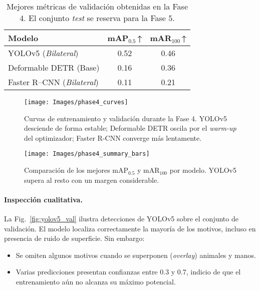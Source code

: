 \begin{table}[!ht]
  \centering
  \caption{Mejores métricas de validación obtenidas en la Fase 4.
           El conjunto \textit{test} se reserva para la Fase 5.}
  \label{tab:phase4_val}
  \begin{tabular}{lcc}
    \hline
    Modelo & mAP\(_{0.5}\)\,↑ & mAR\(_{100}\)\,↑\\
    \hline
    YOLOv5 (\textit{Bilateral})       & 0.52 & 0.46\\
    Deformable DETR (Base)            & 0.16 & 0.36\\
    Faster R--CNN (\textit{Bilateral}) & 0.11 & 0.21\\
    \hline
  \end{tabular}
\end{table}

\begin{figure}[!ht]
  \centering
  \texttt{[image: Images/phase4\_curves]}
  \caption{Curvas de entrenamiento y validación durante la Fase 4.
           YOLOv5 desciende de forma estable; Deformable DETR oscila
           por el \emph{warm-up} del optimizador; Faster R-CNN converge
           más lentamente.}
  \label{fig:phase4_curves}
\end{figure}

\begin{figure}[!ht]
  \centering
  \texttt{[image: Images/phase4\_summary\_bars]}
  \caption{Comparación de los mejores mAP\(_{0.5}\) y mAR\(_{100}\)
           por modelo.  YOLOv5 supera al resto con un margen
           considerable.}
  \label{fig:phase4_bars}
\end{figure}

\paragraph{Inspección cualitativa.}
La Fig.~\ref{fig:yolov5_val} ilustra detecciones de YOLOv5 sobre el conjunto de validación.
El modelo localiza correctamente la mayoría de los motivos, incluso en presencia de ruido de superficie.
Sin embargo:

\begin{itemize}
  \item Se omiten algunos motivos cuando se superponen (\emph{overlay}) animales y manos.
  \item Varias predicciones presentan confianzas entre 0.3 y 0.7, indicio de que el entrenamiento aún no alcanza su máximo potencial.
\end{itemize}

